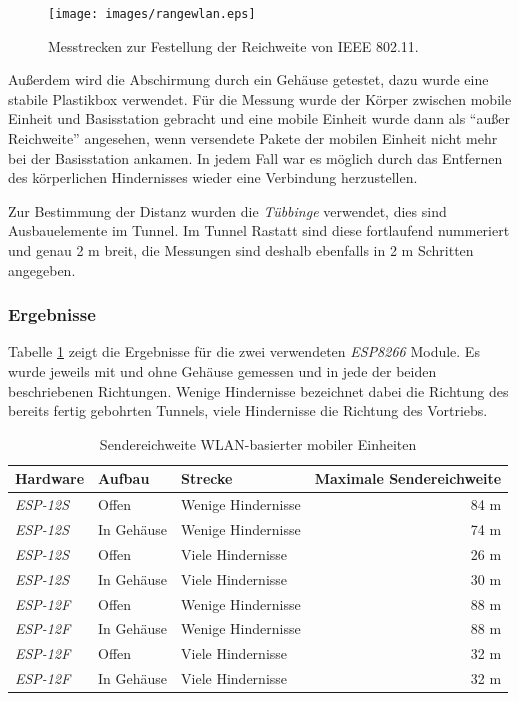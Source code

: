 \begin{figure}[h!]
  \centering
	\texttt{[image: images/rangewlan.eps]}
  \caption{Messtrecken zur Festellung der Reichweite von IEEE 802.11.}
  \label{fig:rangewlan}
\end{figure}

Außerdem wird die Abschirmung durch ein Gehäuse getestet, dazu wurde eine stabile Plastikbox verwendet.
Für die Messung wurde der Körper zwischen mobile Einheit und Basisstation gebracht und eine mobile Einheit wurde dann als "`außer Reichweite"' angesehen, wenn versendete Pakete der mobilen Einheit nicht mehr bei der Basisstation ankamen.
In jedem Fall war es möglich durch das Entfernen des körperlichen Hindernisses wieder eine Verbindung herzustellen.

Zur Bestimmung der Distanz wurden die \emph{Tübbinge} verwendet, dies sind Ausbauelemente im Tunnel.
Im Tunnel Rastatt sind diese fortlaufend nummeriert und genau 2 m breit, die Messungen sind deshalb ebenfalls in 2 m Schritten angegeben.

\subsubsection{Ergebnisse}
Tabelle \ref{table:rangewifi} zeigt die Ergebnisse für die zwei verwendeten \emph{ESP8266} Module.
Es wurde jeweils mit und ohne Gehäuse gemessen und in jede der beiden beschriebenen Richtungen.
Wenige Hindernisse bezeichnet dabei die Richtung des bereits fertig gebohrten Tunnels, viele Hindernisse die Richtung des Vortriebs.

\begin{table}[h]
	\centering
	\caption{Sendereichweite WLAN-basierter mobiler Einheiten}
	\label{table:rangewifi}
	\begin{tabular}{l|l|l|r}
		Hardware & Aufbau & Strecke & Maximale Sendereichweite \\
		\hline
		\emph{ESP-12S} & Offen & Wenige Hindernisse & 84 m \\
		\emph{ESP-12S} & In Gehäuse & Wenige Hindernisse & 74 m \\
		\emph{ESP-12S} & Offen & Viele Hindernisse & 26 m \\
		\emph{ESP-12S} & In Gehäuse & Viele Hindernisse & 30 m \\
		\hline
		\emph{ESP-12F} & Offen & Wenige Hindernisse & 88 m \\
		\emph{ESP-12F} & In Gehäuse & Wenige Hindernisse & 88 m \\
		\emph{ESP-12F} & Offen & Viele Hindernisse & 32 m \\
		\emph{ESP-12F} & In Gehäuse & Viele Hindernisse & 32 m \\
	\end{tabular}
\end{table}


